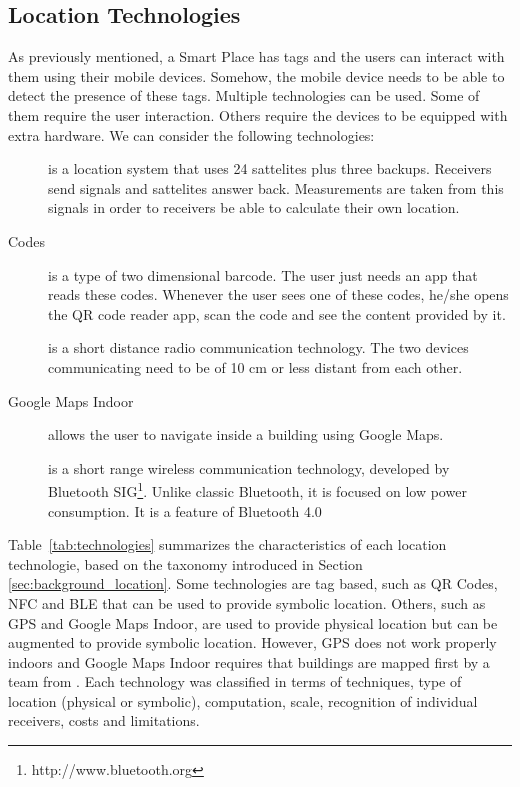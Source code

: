 \subsection{Location Technologies}
\label{sec:background_technologies}
As previously mentioned, a Smart Place has tags and the users can interact with them using their mobile devices.
Somehow, the mobile device needs to be able to detect the presence of these tags.
Multiple technologies can be used.
Some of them require the user interaction.
Others require the devices to be equipped with extra hardware.
We can consider the following technologies:
\begin{description}
  \item[]
  is a location system that uses 24 sattelites plus three backups.
  Receivers send signals and sattelites answer back. Measurements are taken from this signals in order to receivers be able to calculate their own location.
  \item[ Codes]
  is a type of two dimensional barcode.
  The user just needs an app that reads these codes.
  Whenever the user sees one of these codes, he/she opens the \gls{QR} code reader app, scan the code and see the content provided by it.
  \item[]
  is a short distance radio communication technology.
  The two devices communicating need to be of 10 cm or less distant from each other.
  \item[Google Maps Indoor]
  allows the user to navigate inside a building using Google Maps.
  \item[]
  is a short range wireless communication technology, developed by Bluetooth \gls{SIG}\footnote{http://www.bluetooth.org}.
  Unlike classic Bluetooth, it is focused on low power consumption.
  It is a feature of Bluetooth 4.0\cite{bluetooth_specification}
\end{description}

Table~\ref{tab:technologies} summarizes the characteristics of each location technologie, based on the taxonomy introduced in Section \ref{sec:background_location}.
Some technologies are tag based, such as \gls{QR} Codes, \gls{NFC} and \gls{BLE} that can be used to provide symbolic location.
Others, such as \gls{GPS} and Google Maps Indoor, are used to provide physical location but can be augmented to provide symbolic location.
However, \gls{GPS} does not work properly indoors and Google Maps Indoor requires that buildings are mapped first by a team from .
Each technology was classified in terms of techniques, type of location (physical or symbolic), computation, scale, recognition of individual receivers, costs and limitations.

